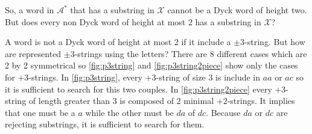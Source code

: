 \begin{tproof}
    So, a word in $\mathcal{A}^*$ that has a substring in $\mathcal{X}$
    cannot be a Dyck word of height two. But does every non Dyck word of height
    at most 2 has a substring in $\mathcal{X}$?

    A word is not a Dyck word of height at most 2 if it include a $\pm 3$-string. But how are represented $\pm 3$-strings using the letters?
    There are 8 different cases which are 2 by 2 symmetrical so
    \autoref{fig:p3string} and \autoref{fig:p3string2piece} show only the
    cases for $+3$-strings. In \autoref{fig:p3string}, every $+3$-string of
    size 3 is include in $aa$ or $ac$ so it is sufficient to search for this
    two couples. In \autoref{fig:p3string2piece} every $+3$-string of length
    greater than 3 is composed of 2 minimal $+2$-strings. It implies that
    one must be a $a$ while the other must be $da$
    of $dc$. Because $da$ or $dc$ are rejecting substrings, it is sufficient
    to search for them.

    \begin{figure}[h!]
        \begin{minipage}{.35\textwidth}
            \centering
\end{minipage}
\end{figure}
\end{tproof}
